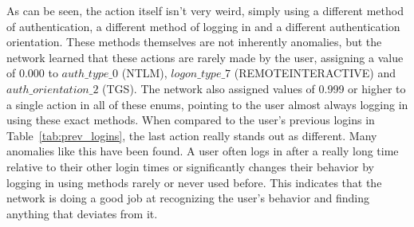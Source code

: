 As can be seen, the action itself isn't very weird, simply using a different method of authentication, a different method of logging in and a different authentication orientation. These methods themselves are not inherently anomalies, but the network learned that these actions are rarely made by the user, assigning a value of 0.000 to \(auth\_type\_0\) (NTLM), \(logon\_type\_7\) (REMOTEINTERACTIVE) and \(auth\_orientation\_2\) (TGS). The network also assigned values of 0.999 or higher to a single action in all of these enums, pointing to the user almost always logging in using these exact methods. When compared to the user's previous logins in Table~\ref{tab:prev_logins}, the last action really stands out as different. Many anomalies like this have been found. A user often logs in after a really long time relative to their other login times or significantly changes their behavior by logging in using methods rarely or never used before. This indicates that the network is doing a good job at recognizing the user's behavior and finding anything that deviates from it.